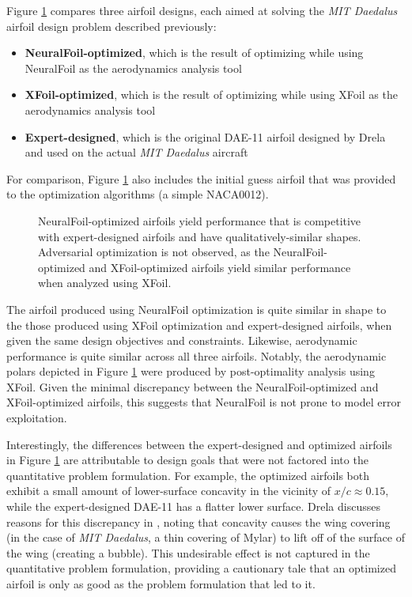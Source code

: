 \documentclass[conf]{new-aiaa}
\begin{document}
    Figure \ref{fig:daedalus_optimized} compares three airfoil designs, each aimed at solving the \emph{MIT Daedalus} airfoil design problem described previously:

    \begin{itemize}
        \item \textbf{NeuralFoil-optimized}, which is the result of optimizing while using NeuralFoil as the aerodynamics analysis tool
        \item \textbf{XFoil-optimized}, which is the result of optimizing while using XFoil as the aerodynamics analysis tool
        \item \textbf{Expert-designed}, which is the original DAE-11 airfoil designed by Drela \cite{drela_lowreynoldsnumber_1988} and used on the actual \emph{MIT Daedalus} aircraft
    \end{itemize}

    For comparison, Figure \ref{fig:daedalus_optimized} also includes the initial guess airfoil that was provided to the optimization algorithms (a simple NACA0012).

    \begin{figure}[h]
        \centering
        
        \caption{NeuralFoil-optimized airfoils yield performance that is competitive with expert-designed airfoils and have qualitatively-similar shapes. Adversarial optimization is not observed, as the NeuralFoil-optimized and XFoil-optimized airfoils yield similar performance when analyzed using XFoil.}
        \label{fig:daedalus_optimized}
    \end{figure}

    The airfoil produced using NeuralFoil optimization is quite similar in shape to the those produced using XFoil optimization and expert-designed airfoils, when given the same design objectives and constraints. Likewise, aerodynamic performance is quite similar across all three airfoils. Notably, the aerodynamic polars depicted in Figure \ref{fig:daedalus_optimized} were produced by post-optimality analysis using XFoil. Given the minimal discrepancy between the NeuralFoil-optimized and XFoil-optimized airfoils, this suggests that NeuralFoil is not prone to model error exploitation.

    Interestingly, the differences between the expert-designed and optimized airfoils in Figure \ref{fig:daedalus_optimized} are attributable to design goals that were not factored into the quantitative problem formulation. For example, the optimized airfoils both exhibit a small amount of lower-surface concavity in the vicinity of $x/c \approx 0.15$, while the expert-designed DAE-11 has a flatter lower surface. Drela discusses reasons for this discrepancy in \cite{drela_pros_1998}, noting that concavity causes the wing covering (in the case of \emph{MIT Daedalus}, a thin covering of Mylar) to lift off of the surface of the wing (creating a bubble). This undesirable effect is not captured in the quantitative problem formulation, providing a cautionary tale that an optimized airfoil is only as good as the problem formulation that led to it.
\end{document}
